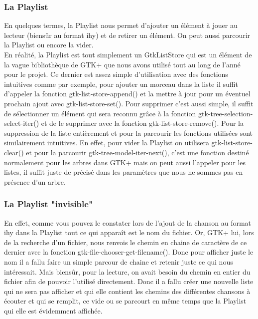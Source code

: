 \documentclass[a4paper,12pt]{report}
\begin{document}
\subsubsection{La Playlist}
En quelques termes, la Playlist nous permet d'ajouter un élément à jouer au
lecteur (biensûr au format ihy) et de retirer un élément. On peut aussi parcourir
la Playlist ou encore la vider.\\
En réalité, la Playlist est tout simplement un GtkListStore qui est un élément
de la vague bibliothèque de GTK+ que nous avons utilisé tout au long de l'anné
pour le projet. Ce dernier est assez simple d'utilisation avec des fonctions
intuitives comme par exemple, pour ajouter un morceau dans la liste il suffit
d'appeler la fonction gtk-list-store-append() et la mettre à jour pour un
éventuel prochain ajout avec gtk-list-store-set(). Pour supprimer c'est aussi
simple, il suffit de sélectionner un élément qui sera reconnu grâce à la
fonction gtk-tree-selection-select-iter() et de le supprimer avec la fonction
gtk-list-store-remove(). Pour la suppression de la liste entièrement et pour la
parcourir les fonctions utilisées sont similairement intuitives. En effet, pour
vider la Playlist on utilisera gtk-list-store-clear() et pour la parcourir
gtk-tree-model-iter-next(), c'est une fonction destiné normalement pour les
arbres dans GTK+ mais on peut aussi l'appeler pour les listes, il suffit juste
de précisé dans les paramètres que nous ne sommes pas en présence d'un arbre.
\subsubsection{La Playlist "invisible"}
En effet, comme vous pouvez le constater lors de l'ajout de la chanson au format
ihy dans la Playlist tout ce qui apparaît est le nom du fichier. Or, GTK+ lui,
lors de la recherche d'un fichier, nous renvois le chemin en chaine de caractère 
de ce dernier avec la fonction gtk-file-chooser-get-filename(). Donc pour
afficher juste le nom il a fallu faire un simple parcour de chaine et retenir
juste ce qui nous intéressait. Mais biensûr, pour la lecture, on avait besoin du
chemin en entier du fichier afin de pouvoir l'utilisé directement. Donc il a
fallu créer une nouvelle liste qui ne sera pas afficher et qui elle contient les
chemins des différentes chansons à écouter et qui se remplit, ce vide ou se
parcourt en même temps que la Playlist qui elle est évidemment affichée.
\end{document}
